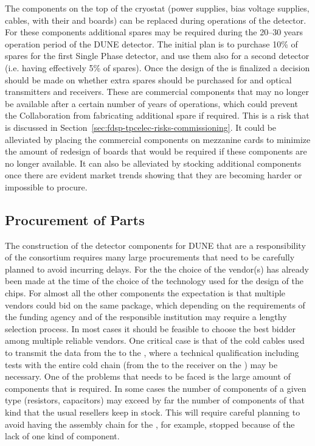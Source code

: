 The components on the top of the cryostat (power supplies, bias
voltage supplies, cables,  with their 
and  boards) can be replaced during operations of the
detector. For these components additional spares may be required
during the 20--30 years operation period of the DUNE detector.
The initial plan is to purchase 10\% of spares for the first
Single  Phase detector, and use them also for a second detector
(i.e. having effectively 5\% of spares). Once the design of
the  is finalized a decision should be made on whether
extra spares should be purchased for  and optical
transmitters and receivers. These are commercial components 
that may no longer be available after a certain number of 
years of operations, which could prevent the Collaboration from
fabricating additional spare  if required. This
is a risk that is discussed in Section~\ref{sec:fdsp-tpcelec-risks-commissioning}.
It could be alleviated by placing the commercial components
on mezzanine cards to minimize the amount of redesign of
boards that would be required if these components are no longer available.
It can also be alleviated by stocking additional components
once there are evident market trends showing that they are 
becoming harder or impossible to procure.

\subsection{Procurement of Parts}
\label{sec:fdsp-tpcelec-production-procurement}

The construction of the detector components for DUNE that are a
responsibility of the  consortium requires many
large procurements that need to be carefully planned to avoid
incurring delays. For the  the choice of the vendor(s)
has already been made at the time of the choice of the technology
used for the design of the chips. For almost all the other components
the expectation is that multiple vendors could bid on the same 
package, which depending on the requirements of the funding
agency and of the responsible institution may require a lengthy
selection process. In most cases it should be feasible to choose
the best bidder among multiple reliable vendors. One critical case
is that of the cold cables used to transmit the data from the
 to the , where a technical qualification
including tests with the entire cold chain (from the 
to the receiver on the ) may be necessary. One of the
problems that needs to be faced is the large amount of components
that is required. In some cases the number of components of a given
type (resistors, capacitors) may exceed by far the number of components
of that kind that the usual resellers keep in stock. This will 
require careful planning to avoid having the assembly chain for
the , for example, stopped because of the lack of
one kind of component.

